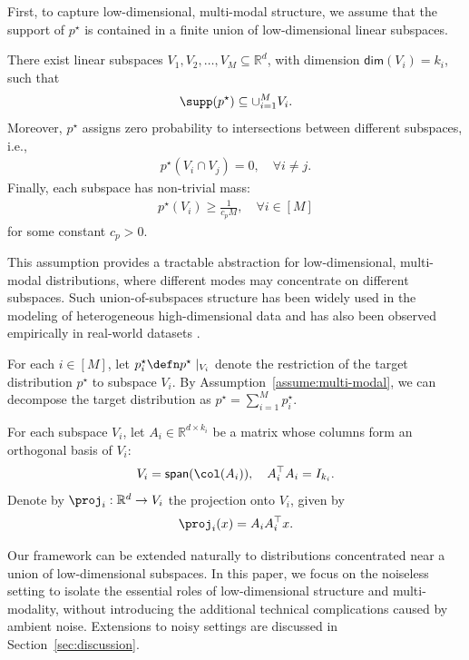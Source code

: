 
First, to capture low-dimensional, multi-modal structure, we assume that the support of $p^\star$ is contained in a finite union of low-dimensional linear subspaces.
\begin{assumption}
    \label{assume:multi-modal}
    There exist linear subspaces $V_1, V_2, \ldots, V_M \subseteq \mathbb{R}^d$, with dimension $\mathsf{dim}(V_i) = k_i$, such that 
    \begin{align*}
        \supp(p^\star) \subseteq \cup_{i=1}^M V_i.
    \end{align*}
    Moreover, $p^\star$ assigns zero probability to intersections between different subspaces, i.e.,
    \begin{align}
        p^\star(V_i \cap V_j) = 0, \quad \forall i\neq j. \label{eq:separation}
    \end{align}
    Finally, each subspace has non-trivial mass:
    \begin{align}
        p^\star(V_i) \geq \frac{1}{c_{p}M}, \quad \forall i\in [M]
    \end{align}
    for some constant $c_{p}>0$. 
\end{assumption}

This assumption provides a tractable abstraction for low-dimensional, multi-modal distributions, where different modes may concentrate on different subspaces. Such union-of-subspaces structure has been widely used in the modeling of heterogeneous high-dimensional data \citep{wang2025diffusionmodelslearnlowdimensional} and has also been observed empirically in real-world datasets \citep{brown2022verifying,kamkari2024geometric}.

For each $i\in [M]$, let $p_i^\star \defn p^\star \mid_{V_i}$ denote the restriction of the target distribution $p^\star$ to subspace $V_i$. By Assumption~\ref{assume:multi-modal}, we can decompose the target distribution as $p^\star = \sum_{i=1}^M p_i^\star$. 


For each subspace $V_i$, let $A_i \in \mathbb{R}^{d\times k_i}$ be a matrix whose columns form an orthogonal basis of $V_i$: 
\begin{align*}
    V_i = \mathsf{span}(\col(A_i)), \quad A_i^{\top}A_i = I_{k_i}.
\end{align*}
Denote by $\proj_i:\mathbb{R}^d \rightarrow V_i$ the projection onto $V_i$, given by
\begin{align*}
    \proj_i(x) = A_iA_i^{\top}x.
\end{align*}
\begin{remark}
    Our framework can be extended naturally to distributions concentrated near a union of low-dimensional subspaces. In this paper, we focus on the noiseless setting to isolate the essential roles of low-dimensional structure and multi-modality, without introducing the additional technical complications caused by ambient noise. Extensions to noisy settings are discussed in Section~\ref{sec:discussion}.
\end{remark}

